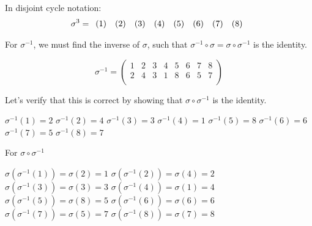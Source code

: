 \documentclass[a4paper]{article}
\begin{document}
\begin{myparindent}{0pt}
In disjoint cycle notation:
\[
    \noindent \sigma^3 =
    \noindent \begin{array}{r} (1) \end{array}
    \noindent \begin{array}{r} (2) \end{array}
    \noindent \begin{array}{r} (3) \end{array}
    \noindent \begin{array}{r} (4) \end{array}
    \noindent \begin{array}{r} (5) \end{array}
    \noindent \begin{array}{r} (6) \end{array}
    \noindent \begin{array}{r} (7) \end{array}
    \noindent \begin{array}{r} (8) \end{array}
\]

For $\sigma^{-1}$, we must find the inverse of $\sigma$, such that $\sigma^{-1} \circ \sigma = \sigma \circ \sigma^{-1}$ is the identity.

\[
    \sigma^{-1} =
  \begin{pmatrix}
      1 & 2 & 3 & 4 & 5 & 6 & 7 & 8 \\
      2 & 4 & 3 & 1 & 8 & 6 & 5 & 7 \\
  \end{pmatrix}
\]

Let's verify that this is correct by showing that $\sigma \circ \sigma^{-1}$ is the identity.

$\sigma^{-1}(1) = 2$ \newline
$\sigma^{-1}(2) = 4$ \newline
$\sigma^{-1}(3) = 3$ \newline
$\sigma^{-1}(4) = 1$ \newline
$\sigma^{-1}(5) = 8$ \newline
$\sigma^{-1}(6) = 6$ \newline
$\sigma^{-1}(7) = 5$ \newline
$\sigma^{-1}(8) = 7$ \newline

For $\sigma \circ \sigma^{-1}$

$\sigma(\sigma^{-1}(1)) = \sigma(2) = 1$ \newline
$\sigma(\sigma^{-1}(2)) = \sigma(4) = 2$ \newline
$\sigma(\sigma^{-1}(3)) = \sigma(3) = 3$ \newline
$\sigma(\sigma^{-1}(4)) = \sigma(1) = 4$ \newline
$\sigma(\sigma^{-1}(5)) = \sigma(8) = 5$ \newline
$\sigma(\sigma^{-1}(6)) = \sigma(6) = 6$ \newline
$\sigma(\sigma^{-1}(7)) = \sigma(5) = 7$ \newline
$\sigma(\sigma^{-1}(8)) = \sigma(7) = 8$ \newline


\end{myparindent}
\end{document}
